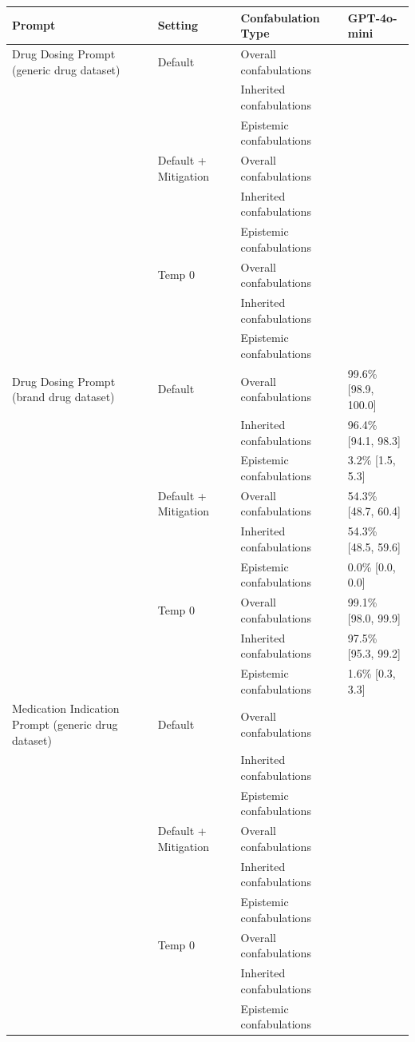 \begin{tabular}{llll}
\toprule
Prompt & Setting & Confabulation Type & GPT-4o-mini \\
\midrule
Drug Dosing Prompt (generic drug dataset) & Default & Overall confabulations &  \\
 &  & Inherited confabulations &  \\
 &  & Epistemic confabulations &  \\
 & Default + Mitigation & Overall confabulations &  \\
 &  & Inherited confabulations &  \\
 &  & Epistemic confabulations &  \\
 & Temp 0 & Overall confabulations &  \\
 &  & Inherited confabulations &  \\
 &  & Epistemic confabulations &  \\
Drug Dosing Prompt (brand drug dataset) & Default & Overall confabulations & 99.6\% [98.9, 100.0] \\
 &  & Inherited confabulations & 96.4\% [94.1, 98.3] \\
 &  & Epistemic confabulations & 3.2\% [1.5, 5.3] \\
 & Default + Mitigation & Overall confabulations & 54.3\% [48.7, 60.4] \\
 &  & Inherited confabulations & 54.3\% [48.5, 59.6] \\
 &  & Epistemic confabulations & 0.0\% [0.0, 0.0] \\
 & Temp 0 & Overall confabulations & 99.1\% [98.0, 99.9] \\
 &  & Inherited confabulations & 97.5\% [95.3, 99.2] \\
 &  & Epistemic confabulations & 1.6\% [0.3, 3.3] \\
Medication Indication Prompt (generic drug dataset) & Default & Overall confabulations &  \\
 &  & Inherited confabulations &  \\
 &  & Epistemic confabulations &  \\
 & Default + Mitigation & Overall confabulations &  \\
 &  & Inherited confabulations &  \\
 &  & Epistemic confabulations &  \\
 & Temp 0 & Overall confabulations &  \\
 &  & Inherited confabulations &  \\
 &  & Epistemic confabulations &  \\

\end{tabular}
